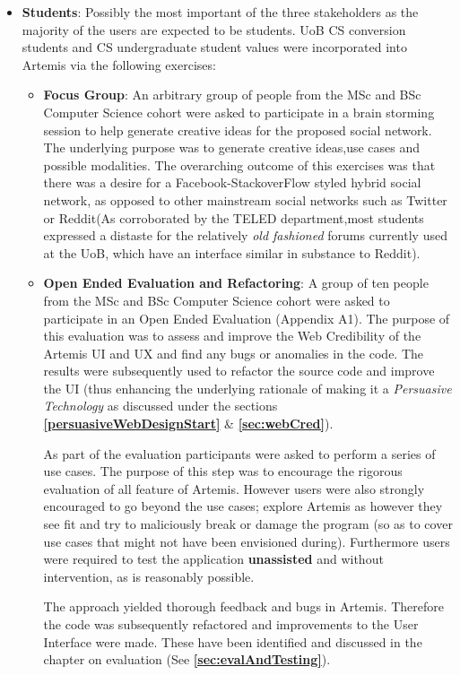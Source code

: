 \begin{itemize}
    \item \textbf{Students}: Possibly the most important of the three stakeholders as the majority of the users are expected to be students. UoB CS conversion students and CS undergraduate student values were incorporated into Artemis via the following exercises:
    
    \begin{itemize}
        
        \item \textbf{Focus Group}: An arbitrary group of people from the MSc and BSc Computer Science cohort were asked to participate in a brain storming session to help generate creative ideas for the proposed social  network. The underlying purpose was to generate creative ideas,use cases and possible modalities. The overarching outcome of this exercises was that there was a desire for a Facebook-StackoverFlow styled hybrid social network, as opposed to other mainstream social networks such as Twitter or Reddit(As corroborated by the TELED department,most students expressed a distaste for the relatively \textit{old fashioned} forums currently used at the UoB, which have an interface similar in substance to Reddit).

        \item \textbf{Open Ended Evaluation and Refactoring}:  A group of ten people from the MSc and BSc Computer Science cohort were asked to participate in an Open Ended Evaluation (Appendix A1). The purpose of this evaluation was to assess and improve the Web Credibility of the Artemis UI and UX  and find any bugs or anomalies in the code. The results were subsequently used to refactor the source code and improve the UI (thus enhancing the underlying rationale of making it a \textit{Persuasive Technology} as discussed under the sections  \textbf{\ref{persuasiveWebDesignStart}} \& \textbf{\ref{sec:webCred}}).
        
        As part of the  evaluation participants were asked to perform a series of use cases. The purpose of this step was to encourage the rigorous evaluation of all feature of Artemis. However users were also strongly encouraged to  go beyond the use cases; explore Artemis as however they see fit and try to maliciously break or damage the program (so as to cover use cases that might not have been envisioned during). Furthermore users were required to test the application \textbf{unassisted} and without intervention, as is reasonably possible.
        
        The approach yielded thorough feedback and bugs in Artemis. Therefore the code was subsequently refactored and improvements to the User Interface were made. These have been identified and discussed in the chapter on evaluation (See \textbf{\ref{sec:evalAndTesting}}).
        
        
    \end{itemize}
    
\end{itemize}

